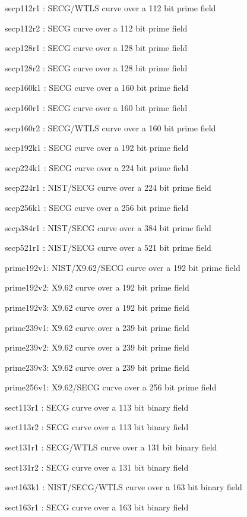 \item   secp112r1 : SECG/WTLS curve over a 112 bit prime field
\item   secp112r2 : SECG curve over a 112 bit prime field
\item   secp128r1 : SECG curve over a 128 bit prime field
\item   secp128r2 : SECG curve over a 128 bit prime field
\item   secp160k1 : SECG curve over a 160 bit prime field
\item   secp160r1 : SECG curve over a 160 bit prime field
\item   secp160r2 : SECG/WTLS curve over a 160 bit prime field
\item   secp192k1 : SECG curve over a 192 bit prime field
\item   secp224k1 : SECG curve over a 224 bit prime field
\item   secp224r1 : NIST/SECG curve over a 224 bit prime field
\item   secp256k1 : SECG curve over a 256 bit prime field
\item   secp384r1 : NIST/SECG curve over a 384 bit prime field
\item   secp521r1 : NIST/SECG curve over a 521 bit prime field
\item   prime192v1: NIST/X9.62/SECG curve over a 192 bit prime field
\item   prime192v2: X9.62 curve over a 192 bit prime field
\item   prime192v3: X9.62 curve over a 192 bit prime field
\item   prime239v1: X9.62 curve over a 239 bit prime field
\item   prime239v2: X9.62 curve over a 239 bit prime field
\item   prime239v3: X9.62 curve over a 239 bit prime field
\item   prime256v1: X9.62/SECG curve over a 256 bit prime field
\item   sect113r1 : SECG curve over a 113 bit binary field
\item   sect113r2 : SECG curve over a 113 bit binary field
\item   sect131r1 : SECG/WTLS curve over a 131 bit binary field
\item   sect131r2 : SECG curve over a 131 bit binary field
\item   sect163k1 : NIST/SECG/WTLS curve over a 163 bit binary field
\item   sect163r1 : SECG curve over a 163 bit binary field
